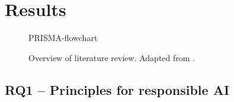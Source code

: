 \section{Results}
\label{sec:Results}
\begin{figure}[p]
    \centering
    {PRISMA-flowchart}
    \caption[Overview of literature review]{Overview of literature review. Adapted from \textcite{PRISMA_2022}.}
    \label{fig:PRISMA-flowchart}
\end{figure}




\subsection{RQ1 -- Principles for responsible AI}





